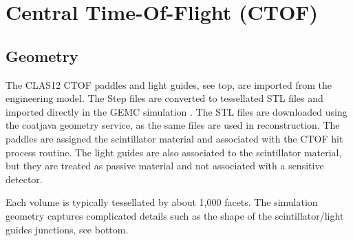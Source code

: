 \section{Central Time-Of-Flight (CTOF)}

\subsection{Geometry}

The CLAS12 CTOF paddles and light guides, see  top, are imported from the engineering model. The Step files are converted to tessellated STL files and imported
directly in the GEMC simulation \cite{gemcCad}. The STL files are downloaded using the coatjava geometry service, as the same files are used in reconstruction.
The paddles are assigned the scintillator material and associated with the CTOF hit process routine.
The light guides are also associated to the scintillator material, but they are treated as passive material and not associated with a sensitive detector.

Each volume is typically tessellated by about 1,000 facets. The simulation geometry captures complicated details such as the shape of the scintillator/light guides
junctions, see  bottom.

